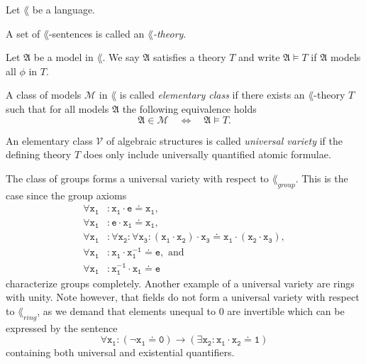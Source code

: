 \begin{defin}
  Let \(\lang\) be a language.
  \begin{thmlist}
    \item A set of \(\lang\)-sentences is called an \emph{\(\lang\)-theory}.

    \item Let \(\mathfrak{A}\) be a model in \(\lang\). We say \(\mathfrak{A}\)
    satisfies a theory \(T\) and write \(\mathfrak{A} \models T\) if
    \(\mathfrak{A}\) models all \(ϕ\) in \(T\).

    \item A class of models \(\mathcal{M}\) in \(\lang\) is called
    \emph{elementary class} if there exists an \(\lang\)-theory \(T\) such that
    for all models
    \(\mathfrak{A}\) the following equivalence holds
    \[
      \mathfrak{A} ∈ \mathcal{M} \quad ⇔ \quad \mathfrak{A} \models T.
    \]

    \item An elementary class \(\mathcal{V}\) of algebraic structures is called
    \emph{universal variety} if the defining theory \(T\) does only include
    universally quantified atomic formulae.
  \end{thmlist}
\end{defin}

\begin{exam}
  The class of groups forms a universal variety with respect to
  \(\lang_{group}\). This is the case since the group axioms
  \begin{align*}
     \mathtt{∀ x_1 } & \mathtt{: x_1 \cdot e \doteq x_1},\\
     \mathtt{∀ x_1 } & \mathtt{: e \cdot x_1 \doteq x_1},\\
     \mathtt{∀ x_1 } & \mathtt{: ∀ x_2 : ∀ x_3 :
             (x_1 \cdot x_2) \cdot x_3 \doteq x_1 \cdot (x_2 \cdot x_3)},\\
     \mathtt{∀ x_1 } & \mathtt{: x_1 \cdot x_1^{-1} \doteq e}, \text{ and}\\
     \mathtt{∀ x_1 } & \mathtt{: x_1^{-1} \cdot x_1 \doteq e}
  \end{align*}
  characterize groups completely. Another example of a universal variety are
  rings with unity. Note however, that fields do not form a universal variety
  with respect to \(\lang_{ring}\), as we demand that elements unequal to \(0\)
  are invertible which can be expressed by the sentence
  \[
    \mathtt{∀ x_1 : (¬ x_1 \doteq 0) → (∃ x_2 : x_1 \cdot x_2 \doteq 1)}
  \]
  containing both universal and existential quantifiers.
\end{exam}

